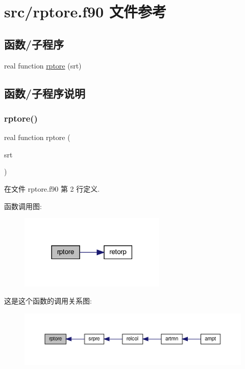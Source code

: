 \hypertarget{rptore_8f90}{}\section{src/rptore.f90 文件参考}
\label{rptore_8f90}
\subsection*{函数/子程序}
\begin{DoxyCompactItemize}
\item 
real function \mbox{\hyperlink{rptore_8f90_a5a20c71d3d3a122035a778e747c3d26f}{rptore}} (srt)
\end{DoxyCompactItemize}


\subsection{函数/子程序说明}
\mbox{\label{rptore_8f90_a5a20c71d3d3a122035a778e747c3d26f}} 
\subsubsection{\texorpdfstring{rptore()}{rptore()}}
{\footnotesize\ttfamily real function rptore (\begin{DoxyParamCaption}\item[{}]{srt }\end{DoxyParamCaption})}



在文件 rptore.\+f90 第 2 行定义.

函数调用图\+:
\nopagebreak
\begin{figure}[H]
\begin{center}
\leavevmode
\includegraphics[width=198pt]{rptore_8f90_a5a20c71d3d3a122035a778e747c3d26f_cgraph}
\end{center}
\end{figure}
这是这个函数的调用关系图\+:
\nopagebreak
\begin{figure}[H]
\begin{center}
\leavevmode
\includegraphics[width=350pt]{rptore_8f90_a5a20c71d3d3a122035a778e747c3d26f_icgraph}
\end{center}
\end{figure}
